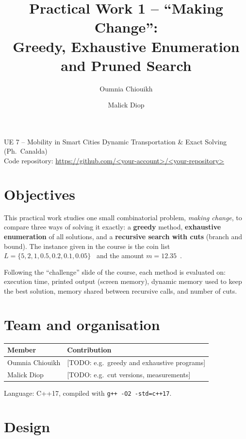 \documentclass[11pt,a4paper]{article}
\title{Practical Work 1 -- ``Making Change'':\\ Greedy, Exhaustive Enumeration and Pruned Search}
\author{Oumnia Chiouikh \and Malick Diop}
\date{}
\begin{document}
\maketitle

\begin{center}
UE 7 -- Mobility in Smart Cities \quad Dynamic Transportation \& Exact Solving (Ph.\ Canalda)\\
Code repository: \url{https://github.com/<your-account>/<your-repository>} %
\end{center}

\tableofcontents
\newpage

\section{Objectives}
This practical work studies one small combinatorial problem, \emph{making change}, to compare three ways of solving it exactly: a \textbf{greedy} method, \textbf{exhaustive enumeration} of all solutions, and a \textbf{recursive search with cuts} (branch and bound). The instance given in the course is the coin list $L=\{5, 2, 1, 0.5, 0.2, 0.1, 0.05\}$~\texteuro{} and the amount $m=12.35$~\texteuro.

Following the ``challenge'' slide of the course, each method is evaluated on: execution time, printed output (screen memory), dynamic memory used to keep the best solution, memory shared between recursive calls, and number of cuts.

\section{Team and organisation}
\begin{center}
\begin{tabular}{@{}ll@{}}
\toprule
Member & Contribution \\
\midrule
Oumnia Chiouikh & [TODO: e.g.\ greedy and exhaustive programs] \\
Malick Diop & [TODO: e.g.\ cut versions, measurements] \\
\bottomrule
\end{tabular}
\end{center}
Language: C++17, compiled with \texttt{g++ -O2 -std=c++17}.

\section{Design}
\end{document}
